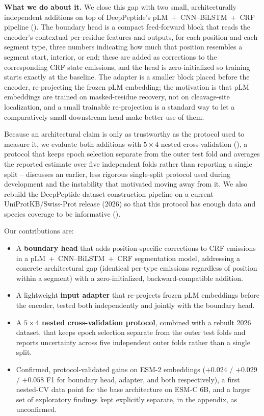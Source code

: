 \documentclass{article}
\begin{document}
\textbf{What we do about it.} We close this gap with two small, architecturally independent additions on top of DeepPeptide's pLM~+~CNN--BiLSTM~+~CRF pipeline (). The boundary head is a compact feed-forward block that reads the encoder's contextual per-residue features and outputs, for each position and each segment type, three numbers indicating how much that position resembles a segment start, interior, or end; these are added as corrections to the corresponding CRF state emissions, and the head is zero-initialized so training starts exactly at the baseline. The adapter is a smaller block placed before the encoder, re-projecting the frozen pLM embedding; the motivation is that pLM embeddings are trained on masked-residue recovery, not on cleavage-site localization, and a small trainable re-projection is a standard way to let a comparatively small downstream head make better use of them.

Because an architectural claim is only as trustworthy as the protocol used to measure it, we evaluate both additions with $5\times4$ nested cross-validation (), a protocol that keeps epoch selection separate from the outer test fold and averages the reported estimate over five independent folds rather than reporting a single split --  discusses an earlier, less rigorous single-split protocol used during development and the instability that motivated moving away from it. We also rebuild the DeepPeptide dataset construction pipeline on a current UniProtKB/Swiss-Prot release (2026) so that this protocol has enough data and species coverage to be informative ().

Our contributions are:
\begin{itemize}
  \item A \textbf{boundary head} that adds position-specific corrections to CRF emissions in a pLM~+~CNN--BiLSTM~+~CRF segmentation model, addressing a concrete architectural gap (identical per-type emissions regardless of position within a segment) with a zero-initialized, backward-compatible addition.
  \item A lightweight \textbf{input adapter} that re-projects frozen pLM embeddings before the encoder, tested both independently and jointly with the boundary head.
  \item A \textbf{$5\times4$ nested cross-validation protocol}, combined with a rebuilt 2026 dataset, that keeps epoch selection separate from the outer test folds and reports uncertainty across five independent outer folds rather than a single split.
  \item Confirmed, protocol-validated gains on ESM-2 embeddings ($+0.024$ / $+0.029$ / $+0.058$ F1 for boundary head, adapter, and both respectively), a first nested-CV data point for the base architecture on ESM-C 6B, and a larger set of exploratory findings kept explicitly separate, in the appendix, as unconfirmed.
\end{itemize}
\end{document}
